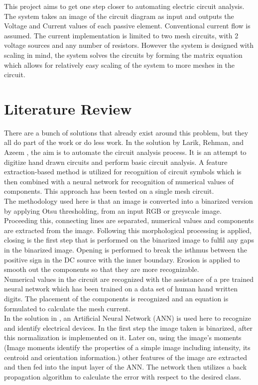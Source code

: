 \documentclass[conference]{IEEEtran}
\begin{document}
This project aims to get one step closer to automating electric circuit analysis. The system takes an image of the circuit diagram as input and outputs the Voltage and Current values of each passive element. Conventional current flow is assumed. The current implementation is limited to two mesh circuits, with 2 voltage sources and any number of resistors. However the system is designed with scaling in mind, the system solves the circuits by forming the matrix equation which allows for relatively easy scaling of the system to more meshes in the circuit. 
 

\section{\textbf{Literature Review}}
There are a bunch of solutions that already exist around this problem, but they all do part of the work or do less work. In the solution by Larik, Rehman, and Azeem \cite{SIFT}, the aim is to automate the circuit analysis process. It is an attempt to digitize hand drawn circuits and perform basic circuit analysis. A feature extraction-based method is utilized for recognition of circuit symbols which is then combined with a neural network for recognition of numerical values of components. This approach has been tested on a single mesh circuit.  \\
\noindent
The methodology used here is that an image is converted into a binarized version by applying Otsu thresholding, from an input RGB or greyscale image. Proceeding this, connecting lines are separated, numerical values and components are extracted from the image. Following this morphological processing is applied, closing is the first step that is performed on the binarized image to fulfil any gaps in the binarized image. Opening is performed to break the isthmus between the positive sign in the DC source with the inner boundary. Erosion is applied to smooth out the components so that they are more recognizable.  \\
\noindent
Numerical values in the circuit are recognized with the assistance of a pre trained neural network which has been trained on a data set of human hand written digits. The placement of the components is recognized and an equation is formulated to calculate the mesh current.\\

\noindent
 In the solution in \cite{ANNs}, an Artificial Neural Network (ANN) is used here to recognize and identify electrical devices. In the first step the image taken is binarized, after this normalization is implemented on it. Later on, using the image’s moments (Image moments identify the properties of a simple image including intensity, its centroid and orientation information.) other features of the image are extracted and then fed into the input layer of the ANN. The network then utilizes a back propagation algorithm to calculate the error with respect to the desired class. 
\end{document}

